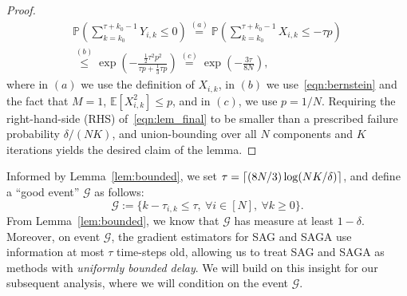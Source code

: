 \documentclass{article}
\theoremstyle{plain}
\theoremstyle{definition}
\newcommand{\E}{\mathbb{E}}
\renewcommand{\P}{\mathbb{P}}
\newcommand{\cG}{\mathcal{G}}
\newcommand{\paren}[1]{\left( #1\right)}
\DeclarePairedDelimiter{\ceil}{\lceil}{\rceil}
\begin{document}
\begin{proof}
\begin{equation}
\begin{aligned}
    \P\paren{\sum_{k=k_0}^{\tau+k_0-1} Y_{i,k}\leq 0}\overset{(a)}{=}\P\paren{\sum_{k=k_0}^{\tau+k_0-1} X_{i,k}\leq -\tau p}\\
    \overset{(b)}{\leq} \exp\paren{-\frac{\frac{1}{2}\tau^2p^2}{\tau p+\frac{1}{3}\tau p}}
    \overset{(c)}{=}\exp\paren{-\frac{3\tau}{8N}},\label{eqn:lem_final}
\end{aligned}
\end{equation}
where in $(a)$ we use the definition of $X_{i,k}$, in $(b)$ we use~\eqref{eqn:bernstein} and the fact that $M=1$, $\E[X_{i,k}^2]\leq p$, and in $(c)$, we use $p=1/N$. 
Requiring the right-hand-side (RHS) of~\eqref{eqn:lem_final} to be smaller than a prescribed failure probability $\delta/(NK)$, and union-bounding over all $N$ components and $K$ iterations yields the desired claim of the lemma.
\end{proof}

Informed by Lemma~\ref{lem:bounded}, we set $\tau= \ceil{(8N/3)\log (NK/\delta)}$, and define a ``good event'' $\cG$ as follows:
\begin{equation}
\boxed{
    \cG:=\{k-\tau_{i,k}\leq \tau, \ \forall i\in[N], \ \forall k\geq 0\}.}\label{eqn:event}
\end{equation}
From Lemma~\ref{lem:bounded}, we know that $\cG$ has measure at least $1-\delta$. Moreover, on event $\cG$, the gradient estimators 
for SAG and SAGA use information at most $\tau$ time-steps old, allowing us to treat SAG and SAGA as methods with \textit{uniformly bounded delay}. We will build on this insight for our subsequent analysis, where we will condition on the event $\cG$.
\end{document}
